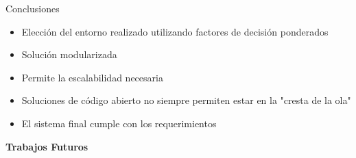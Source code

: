 \begin{frame}{Conclusiones}
    \vspace{0cm}
    \begin{itemize}
        \item Elección del entorno realizado utilizando factores de decisión ponderados
        \item Solución modularizada
        \item Permite la escalabilidad necesaria
        \item Soluciones de código abierto no siempre permiten estar en la "cresta de la ola"
        \item El sistema final cumple con los requerimientos
    \end{itemize}



\end{frame}


\begin{frame}
    \Huge
    \centering
    \textbf{Trabajos Futuros}

\end{frame}

